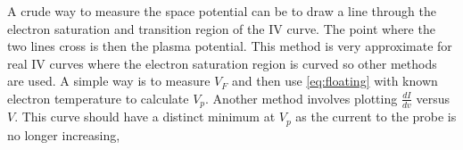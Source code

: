\documentclass[12pt]{article}
\begin{document}
A crude way to measure the space potential can be to draw a line through the electron saturation and transition region of the IV curve. The point where the two lines cross is then the plasma potential. This method is very approximate for real IV curves where the electron saturation region is curved so other methods are used. A simple way is to measure $V_F$ and then use \eqref{eq:floating} with known electron temperature to calculate $V_{p}$. Another method involves plotting $\frac{dI}{dv}$ versus $V$. This curve should have a distinct minimum at $V_{p}$ as the current to the probe is no longer increasing, 
%
%
%
%
%
%
\end{document}
